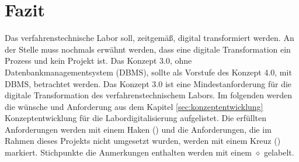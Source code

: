 \section{Fazit}

Das verfahrenstechnische Labor soll, zeitgemäß, digital transformiert werden. An der Stelle muss nochmals erwähnt werden, dass eine digitale Transformation ein Prozess und kein Projekt ist. Das Konzept 3.0, ohne Datenbankmanagementsystem (DBMS), sollte als Vorstufe des Konzept 4.0, mit DBMS, betrachtet werden. Das Konzept 3.0 ist eine Mindestanforderung für die digitale Transformation des verfahrenstechnischem Labors. Im folgenden werden die wünsche und Anforderung aus dem Kapitel \ref{sec:konzeptentwicklung} {\Hypatia Konzeptentwicklung für die Labordigitalisierung} aufgelistet. Die erfüllten Anforderungen werden mit einem Haken (\cmark) und die Anforderungen, die im Rahmen dieses Projekts nicht umgesetzt wurden, werden mit einem Kreuz (\xmark) markiert. Stichpunkte die Anmerkungen enthalten werden mit einem $\diamond$ gelabelt.

